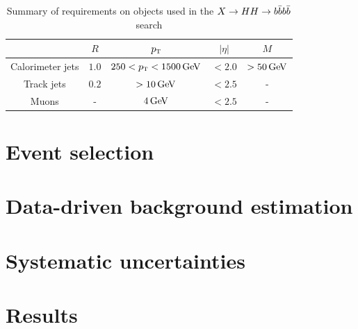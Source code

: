\begin{table}[h!]
\centering
\captionsetup{justification=centering}

\hspace{-10pt}
\begin{tabular}{|c|c|c|c|c|}
\hline
& $R$ & $p_{\textrm{\footnotesize\sc t}} $ & $|\eta|$ & $M$ \\ \hline
Calorimeter jets & $1.0$ & $250 < \pT < 1500 \GeV$ & $ < 2.0$ & $ > 50 \GeV$ \\ \hline
Track jets & $0.2$ & $> 10 \GeV$ & $< 2.5$ & - \\ \hline
Muons & - & $4 \GeV$ & $< 2.5$ & - \\ \hline
\end{tabular}

\caption{
Summary of requirements on objects used in the $X\to HH \to b\bar{b}b\bar{b}$ search
}
\label{tab:4b_req}
\end{table}

\section{Event selection}

\section{Data-driven background estimation}

\section{Systematic uncertainties}

\section{Results}


